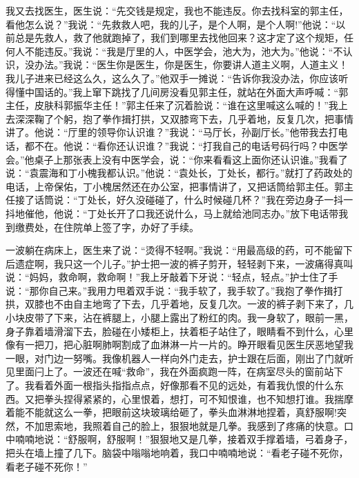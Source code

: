 \documentclass[12pt,oneside]{book}
\begin{document}
我又去找医生，医生说：``先交钱是规定，我也不能违反。你去找科室的郭主任，看他怎么说？''我说：``先救救人吧，我的儿子，是个人啊，是个人啊!''他说：``以前总是先救人，救了他就跑掉了，我们到哪里去找他回来？这才定了这个规矩，任何人不能违反。''我说：``我是厅里的人，中医学会，池大为，池大为。''他说：``不认识，没办法。''我说：``医生你是医生，你是医生，你要讲人道主义啊，人道主义！我儿子进来已经这么久，这么久了。''他双手一摊说：``告诉你我没办法，你应该听得懂中国话的。''我上窜下跳找了几间房没看见郭主任，就站在外面大声呼喊：``郭主任，皮肤科郭振华主任！''郭主任来了沉着脸说：``谁在这里喊这么喊的！''我上去深深鞠了个躬，抱了拳作揖打拱，又双膝弯下去，几乎着地，反复几次，把事情讲了。他说：``厅里的领导你认识谁？''我说：``马厅长，孙副厅长。''他带我去打电话，都不在。他说：``看你还认识谁？''我说：``打我自己的电话号码行吗？中医学会。''他桌子上那张表上没有中医学会，说：``你来看看这上面你还认识谁。''我看了说：``袁震海和丁小槐我都认识。''他说：``袁处长，丁处长，都行。''就打了药政处的电话，上帝保佑，丁小槐居然还在办公室，把事情讲了，又把话筒给郭主任。郭主任接了话筒说：``丁处长，好久没碰碰了，什么时候碰几杯？''我在旁边身子一抖一抖地催他，他说：``丁处长开了口我还说什么，马上就给池同志办。''放下电话带我到缴费处，在住院单上签了字，办好了手续。

一波躺在病床上，医生来了说：``烫得不轻啊。''我说：``用最高级的药，可不能留下后遗症啊，我只这一个儿子。''护士把一波的裤子剪开，轻轻剥下来，一波痛得真叫说：``妈妈，救命啊，救命啊！''我上牙敲着下牙说：``轻点，轻点。''护士住了手说：``那你自己来。''我用力甩着双手说：``我手软了，我手软了。''我抱了拳作揖打拱，双膝也不由自主地弯了下去，几乎着地，反复几次。一波的裤子剥下来了，几小块皮带了下来，沾在裤腿上，小腿上露出了粉红的肉。我一身软了，眼前一黑，身子靠着墙滑溜下去，脸碰在小矮柜上，扶着柜子站住了，眼睛看不到什么，心里像有一把刀，把心脏啊肺啊割成了血淋淋一片一片的。睁开眼看见医生厌恶地望我一眼，对门边一努嘴。我像机器人一样向外门走去，护士跟在后面，刚出了门就听见里面闩上了。一波还在喊``救命''，我在外面疯跑一阵，在病室尽头的窗前站下了。我看着外面一根指头指指点点，好像那看不见的远处，有着我仇恨的什么东西。又把拳头捏得紧紧的，心里恨着，想打，可不知恨谁，也不知想打谁。我揣摩着能不能就这么一拳，把眼前这块玻璃给砸了，拳头血淋淋地捏着，真舒服啊!突然，不加思索地，我照着自己的脸上，狠狠地就是几拳。我感到了疼痛的快意。口中喃喃地说：``舒服啊，舒服啊！''狠狠地又是几拳，接着双手撑着墙，弓着身子，把头在墙上撞了几下。脑袋中嗡嗡地响着，我口中喃喃地说：``看老子碰不死你，看老子碰不死你！''
\end{document}
